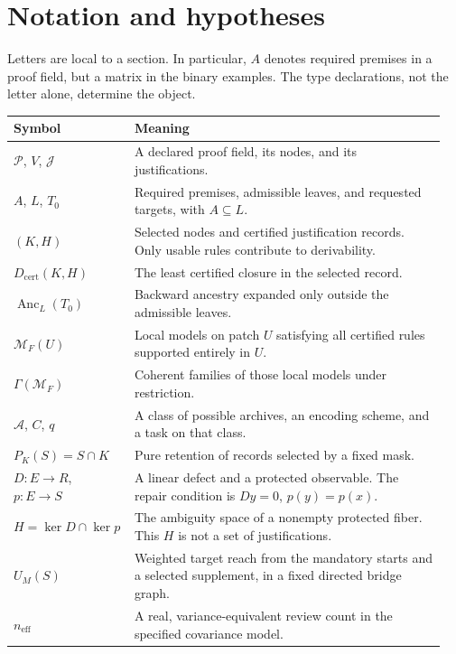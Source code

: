 \documentclass[11pt,oneside]{article}
\theoremstyle{komorebiplain}
\theoremstyle{komorebidefinition}
\theoremstyle{komorebiremark}
\newcommand{\Pcal}{\mathcal P}
\newcommand{\Jcal}{\mathcal J}
\newcommand{\Anc}{\operatorname{Anc}}
\begin{document}
\section{Notation and hypotheses}
\label{app:notation}

Letters are local to a section. In particular, $A$ denotes required premises in a proof field, but a matrix in the binary examples. The type declarations, not the letter alone, determine the object.

\begin{longtable}{@{}L{0.24\linewidth}L{0.71\linewidth}@{}}
\toprule
Symbol & Meaning \\
\midrule
\endhead
$\Pcal$, $V$, $\Jcal$ & A declared proof field, its nodes, and its justifications. \\
$A$, $L$, $T_0$ & Required premises, admissible leaves, and requested targets, with $A\subseteq L$. \\
$(K,H)$ & Selected nodes and certified justification records. Only usable rules contribute to derivability. \\
$D_{\mathrm{cert}}(K,H)$ & The least certified closure in the selected record. \\
$\Anc_L(T_0)$ & Backward ancestry expanded only outside the admissible leaves. \\
$\mathcal M_F(U)$ & Local models on patch $U$ satisfying all certified rules supported entirely in $U$. \\
$\Gamma(\mathcal M_F)$ & Coherent families of those local models under restriction. \\
$\mathscr A$, $C$, $q$ & A class of possible archives, an encoding scheme, and a task on that class. \\
$P_K(S)=S\cap K$ & Pure retention of records selected by a fixed mask. \\
$D:E\to R$, $p:E\to S$ & A linear defect and a protected observable. The repair condition is $Dy=0$, $p(y)=p(x)$. \\
$H=\ker D\cap\ker p$ & The ambiguity space of a nonempty protected fiber. This $H$ is not a set of justifications. \\
$U_M(S)$ & Weighted target reach from the mandatory starts and a selected supplement, in a fixed directed bridge graph. \\
$n_{\mathrm{eff}}$ & A real, variance-equivalent review count in the specified covariance model. \\
\bottomrule
\end{longtable}
\end{document}
